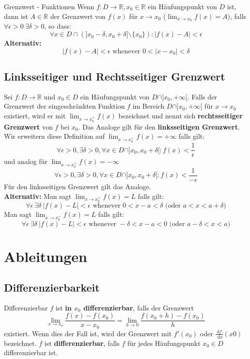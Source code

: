 \documentclass[a4paper,8pt]{extarticle}
\def\R{\mathbb{R}}
\def\dx{\text{ d}x}
\begin{document}
\begin{mainbox}{Grenzwert - Funktionen}
 Wenn $f: D \to \R, x_0 \in \R$ ein Häufungspunkt von $D$ ist, dann ist $A \in \R$ der Grenzwert von $f(x)$ für $x \to x_0$ ($\lim_{x\to x_0} f(x) = A$), falls $\forall \epsilon > 0 \ \exists \delta > 0$, so dass: $$\forall x \in D \cap (]x_0 - \delta, x_0 + \delta[ \backslash \{x_0\}): |f(x) - A| < \epsilon$$
 \textbf{Alternativ:} $$|f(x) - A| < \epsilon \text{ whenever } 0 < |x - x_0| < \delta$$
\end{mainbox}

\subsection{Linksseitiger und Rechtsseitiger Grenzwert}
Sei $f: D \to \R$ und $x_0 \in D$ ein Häufungspunkt von $D \cap ]x_0, +\infty[$. Falls der Grenzwert der eingeschränkten Funktion $f$ im Bereich $D \cap ]x_0, +\infty[$ für $x \to x_0$ existiert, wird er mit $\lim_{x\to x_0^+}f(x)$ bezeichnet und nennt sich \textbf{rechtsseitiger Grenzwert} von $f$ bei $x_0$. Das Analoge gilt für den \textbf{linksseitigen Grenzwert}. \\
Wir erweitern diese Definition auf $\lim_{x\to x_0^+}f(x) = + \infty$ falls gilt: $$\forall \epsilon > 0, \exists \delta > 0, \forall x \in D \cap ]x_0, x_0 + \delta[: f(x) < \frac{1}{\epsilon}$$
und analog für $\lim_{x\to x_0^+}f(x) = - \infty$ $$\forall \epsilon > 0, \exists \delta > 0, \forall x \in D \cap ]x_0, x_0 + \delta[: f(x) < \frac{1}{-\epsilon}$$
Für den linksseitigen Grenzwert gilt das Analoge. \\
\textbf{Alternativ:} Man sagt $\lim_{x \to x_0^+} f(x) = L$ falls gilt: $$\forall \epsilon \ \exists \delta \ |f(x) - L| < \epsilon \text{ whenever } 0 < x - a < \delta \text{ (oder } a < x  < a + \delta )$$
Man sagt $\lim_{x \to x_0^+} f(x) = L$ falls gilt: $$\forall \epsilon \ \exists \delta \ |f(x) - L| < \epsilon \text{ whenever } -\delta < x - a < 0 \text{ (oder } a - \delta < x  < a )$$

\section{Ableitungen}
\subsection{Differenzierbarkeit}
\begin{mainbox}{Differenzierbar}
 $f$ ist \textbf{in $x_0$ differenzierbar}, falls der Grenzwert $$\lim_{x\to x_0} \frac{f(x) - f(x_0)}{x - x_0} = \lim_{h \to 0} \frac{f(x_0 + h) - f(x_0)}{h}$$ existiert. Wenn dies der Fall ist, wird der Grenzwert mit $f'(x_0)$ oder $\frac{\text{d}f}{\dx}(x0)$ bezeichnet. $f$ ist \textbf{differenzierbar}, falls $f$ für jedes Häufungspunkt $x_0 \in D$ differenzierbar ist.
\end{mainbox}
\end{document}
